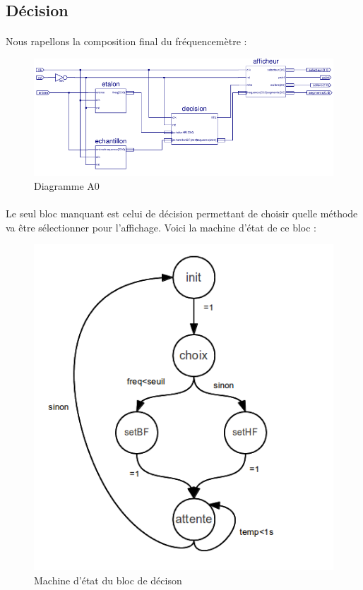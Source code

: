 \documentclass[a4paper,11pt]{article}
\begin{document}
  \subsection{Décision}
 \paragraph{} Nous rapellons la composition final du fréquencemètre :
 
 \begin{figure}[H]
\begin{center}
	\includegraphics[scale=1]{sch-frequencemetre.png}
	\caption{Diagramme A0}
\end{center}
\end{figure}

  \paragraph{}Le seul bloc manquant est celui de décision permettant de choisir quelle méthode va être 
  sélectionner pour l'affichage. Voici la machine d'état de ce bloc :
  
   \begin{figure}[H]
\begin{center}
	\includegraphics[scale=.6]{machine_decision.png}
	\caption{Machine d'état du bloc de décison}
\end{center}
\end{figure}
  
\end{document}
